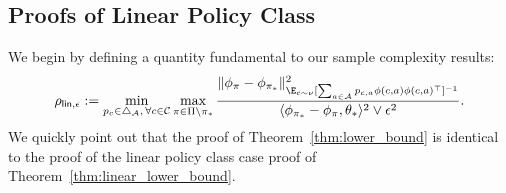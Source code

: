 \documentclass{article}
\newcommand{\mc}[1]{\mathcal{#1}}
\newcommand{\lalit}[1]{\textcolor{blue}{}}
\newcommand{\1}{\mathbf{1}}
\begin{document}
\subsection{Proofs of Linear Policy Class}
 We begin by defining a quantity fundamental to our sample complexity results:
\begin{align}\label{eqn:linepsilon}
    \rho_{ {\sf lin},\epsilon} := \min_{p_c  \in \triangle_{\mc{A}}, \, \forall c \in \mc{C}} \max_{\pi \in \Pi \setminus \pi_*} \frac{ \| \phi_\pi - \phi_{\pi_*} \|^2_{\E_{c \sim \nu}[ \sum_{a \in \mc{A}} p_{c,a} \phi(c,a) \phi(c,a)^{\top} ]^{-1}} }{ \langle \phi_{\pi_*} - \phi_\pi , \theta_* \rangle^2 \vee \epsilon^2 }. 
\end{align}
\lalit{
For the special case of $\epsilon=0$, we have that $\rho_{ {\sf lin},\epsilon}$ simplifies to \lalit{We should prove this - but maybe we can rip it out.}
\begin{align*}
    \rho_{ {\sf lin},0}
    = \min_{p_c  \in \triangle_{\mc{A}}, \, \forall c \in \mc{C}} \max_{(c',a) \in \mc{C} \times \mc{A} : \pi_*(c') \neq a} \frac{ \| \phi(c',a) - \phi(c',\pi_*(c')) \|^2_{\E_{c \sim \nu}[ \sum_{a \in \mc{A}} p_{c,a} \phi(c,a) \phi(c,a)^{\top} ]^{-1}} }{ \langle  \phi(c',\pi_*(c'))-\phi(c',a) , \theta_* \rangle^2  }.
\end{align*}
This essentially says you have to solve the best-arm identification problem for each context \cite{soare2014best,fiez2019sequential,degenne2020gamification}, which is very intuitive.
This simplification is proven as part of the following theorem:
}
We quickly point out that the proof of Theorem~\ref{thm:lower_bound} is identical to the proof of the linear policy class case proof of Theorem~\ref{thm:linear_lower_bound}.
\end{document}
